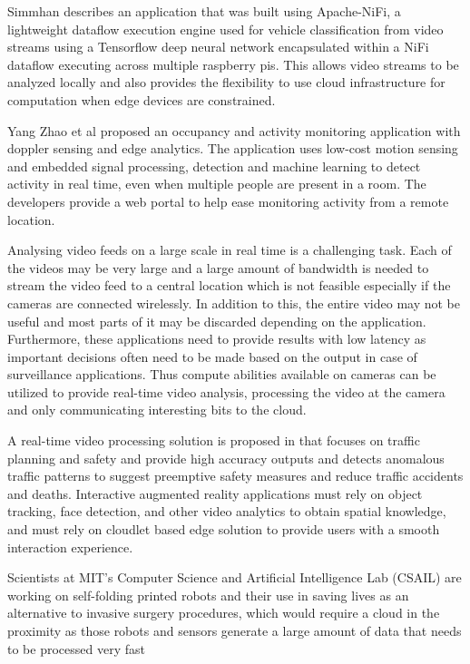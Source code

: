 \documentclass[sigconf]{acmart}
\begin{document}
Simmhan describes an application that was built using Apache-NiFi, a lightweight dataflow execution engine used for vehicle classification from video streams using a Tensorflow deep neural network encapsulated within a NiFi dataflow executing across multiple raspberry pis. This allows video streams to be analyzed locally and also provides the flexibility to use cloud infrastructure for computation when edge devices are constrained.\cite{ieee_iot_cloud_analytics_newsletter}

Yang Zhao et al proposed an occupancy and activity monitoring application with doppler sensing and edge analytics. The application uses low-cost motion sensing and embedded signal processing, detection and machine learning to detect activity in real time, even when multiple people are present in a room. The developers provide a web portal to help ease monitoring activity from a remote location.\citep{Dolppler-usecase}

Analysing video feeds on a large scale in real time is a challenging task. Each of the videos may be very large and a large amount of bandwidth is needed to stream the video feed to a central location which is not feasible especially if the cameras are connected wirelessly. In addition to this, the entire video may not be useful and most parts of it may be discarded depending on the application. Furthermore, these applications need to provide results with low latency as important decisions often need to be made based on the output in case of surveillance applications.\cite{rocket-real-time-video} Thus compute abilities available on cameras can be utilized to provide real-time video analysis, processing the video at the camera and only communicating interesting bits to the cloud.\cite{satyanarayananemergence}

A real-time video processing solution is proposed in \cite{rocket-real-time-video} that focuses on traffic planning and safety and provide high accuracy outputs and detects anomalous traffic patterns to suggest preemptive safety measures and reduce traffic accidents and deaths.
Interactive augmented reality applications must rely on object tracking, face detection, and other video analytics to obtain spatial knowledge, and must rely on cloudlet based edge solution to provide users with a smooth interaction experience.\cite{rocket-real-time-video}

Scientists at MIT's Computer Science and Artificial Intelligence Lab (CSAIL) are working on self-folding printed robots and their use in saving lives as an alternative to invasive surgery procedures, which would require a cloud in the proximity as those robots and sensors generate a large amount of data that needs to be processed very fast\cite{open_stack_living_on_edge}
\end{document}
